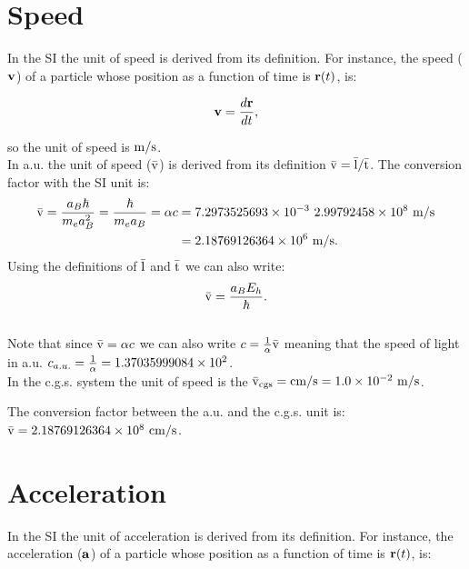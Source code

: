 \documentclass[12pt,a4paper,twoside]{report}
\def\cspeed{2.99792458\times 10^{8}}
\def\alphaf{7.2973525693\times 10^{-3}}
\def\barv{2.18769126364\times 10^{6}}
\def\cmtom{1.0\times 10^{-2}}
\def\barvcgs{2.18769126364\times 10^{8}}
\def\cspeedau{1.37035999084\times 10^{2}}
\begin{document}
\newpage
{\color{coral}\section{Speed}}
\color{black}
In the SI the unit of speed is derived from its definition.
For instance, the speed (${\bf v}$) of a particle 
whose position as a function of time is ${\bf r}(t)$, is:

\begin{tcolorbox}
\begin{equation}
{\bf v}={d{\bf r} \over dt},
\end{equation} 
\end{tcolorbox}

so the unit of speed is ${\rm m}/{\rm s}$.
\\

{\color{web-blue} In a.u. the unit of speed (${\rm \bar v}$) is derived 
from its definition ${\rm \bar v} = {\rm \bar l} / {\rm \bar t}$. The conversion factor
with the SI unit is:
\begin{align}
{\rm \bar v} ={a_B \hbar \over m_e a_B^2}={\hbar \over m_e a_B}=\alpha c&=
 {\alphaf\  \cspeed\ {\rm m}/{\rm s}}\nonumber \\ 
&=\barv\ {\rm m}/{\rm s}.
\end{align}
Using the definitions of ${\rm \bar l}$ and ${\rm \bar t}$ we can also write:
\begin{equation}
{\rm \bar v}={a_B E_h \over \hbar}.
\end{equation}
\\
Note that since ${\rm \bar v}= \alpha c$ we can also write 
$c={1\over \alpha} {\rm \bar v}$ meaning that the speed of light in a.u. 
$c_{a.u.}={1\over\alpha}=\cspeedau$.
}
\\

{\color{orange} In the c.g.s. system the unit of speed is the 
${\rm \bar v_{cgs}}={\rm cm}/{\rm s} = \cmtom\ {\rm m}/{\rm s}$.
\\
}

{\color{green} The conversion factor between the a.u. and the c.g.s. unit is:
${\rm \bar v}=\barvcgs\ {\rm cm}/{\rm s}$.
\\
}

\newpage
{\color{coral}\section{Acceleration}}
\color{black}
In the SI the unit of acceleration is derived from its  
definition. For instance, the acceleration (${\bf a}$) of a particle whose
position as a function of time is ${\bf r}(t)$, is: 
\end{document}
